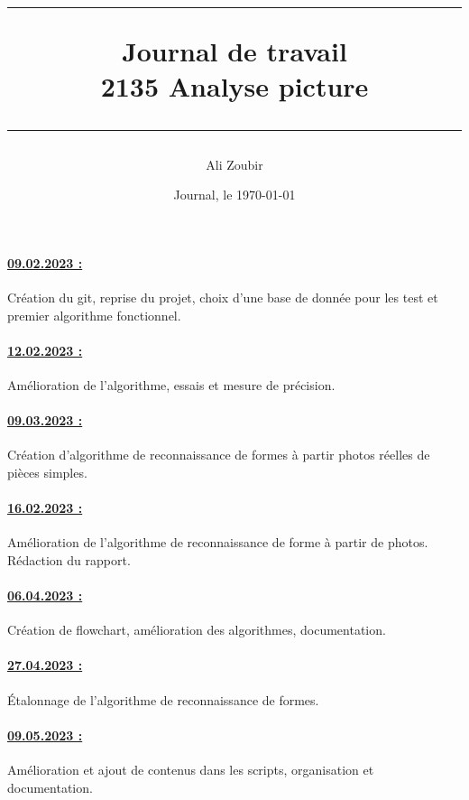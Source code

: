 \documentclass[a4paper, 12pt]{article}
\title{\rule{\textwidth}{1.5pt}\vspace{0ex}
	Journal de travail \\
    2135 Analyse picture
\vspace{-1ex}\rule{\textwidth}{1.5pt}}
\author{Ali Zoubir}
\date{Journal, le \today}
\begin{document}
	
	\begin{titlepage}
		\maketitle
		\thispagestyle{empty}
		\thispagestyle{empty}
	\end{titlepage}
	
        \paragraph{\underline{09.02.2023 :}} Création du git, reprise du projet, choix d'une base de donnée pour les test et premier algorithme fonctionnel.

        \paragraph{\underline{12.02.2023 :}} Amélioration de l'algorithme, essais et mesure de précision.

        \paragraph{\underline{09.03.2023 :}} Création d'algorithme de reconnaissance de formes à partir photos réelles de pièces simples.

        \paragraph{\underline{16.02.2023 :}} Amélioration de l'algorithme de reconnaissance de forme à partir de photos. Rédaction du rapport.

        \paragraph{\underline{06.04.2023 :}} Création de flowchart, amélioration des algorithmes, documentation.

        \paragraph{\underline{27.04.2023 :}} Étalonnage de l'algorithme de reconnaissance de formes.

        \paragraph{\underline{09.05.2023 :}} Amélioration et ajout de contenus dans les scripts, organisation et documentation.
\end{document}
